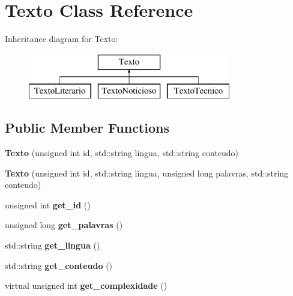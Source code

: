 \hypertarget{class_texto}{\section{Texto Class Reference}
\label{class_texto}
}
Inheritance diagram for Texto\-:\begin{figure}[H]
\begin{center}
\leavevmode
\includegraphics[height=2.000000cm]{class_texto}
\end{center}
\end{figure}
\subsection*{Public Member Functions}
\begin{DoxyCompactItemize}
\item 
\hypertarget{class_texto_a7034548c1e8e2007b0825ef3a01b1b88}{{\bfseries Texto} (unsigned int id, std\-::string lingua, std\-::string conteudo)}\label{class_texto_a7034548c1e8e2007b0825ef3a01b1b88}

\item 
\hypertarget{class_texto_a3ccc9eb8eb980eda5e5f6583cbb60425}{{\bfseries Texto} (unsigned int id, std\-::string lingua, unsigned long palavras, std\-::string conteudo)}\label{class_texto_a3ccc9eb8eb980eda5e5f6583cbb60425}

\item 
\hypertarget{class_texto_a4e1b7a020c3b1cffe4518937cdd6f565}{unsigned int {\bfseries get\-\_\-id} ()}\label{class_texto_a4e1b7a020c3b1cffe4518937cdd6f565}

\item 
\hypertarget{class_texto_a249af46529ab15e98103f1ebe9c3cabb}{unsigned long {\bfseries get\-\_\-palavras} ()}\label{class_texto_a249af46529ab15e98103f1ebe9c3cabb}

\item 
\hypertarget{class_texto_adfaca963b37bef9a739def84e2c810b6}{std\-::string {\bfseries get\-\_\-lingua} ()}\label{class_texto_adfaca963b37bef9a739def84e2c810b6}

\item 
\hypertarget{class_texto_a01a9590011195b1a258e2d3bd247ceb0}{std\-::string {\bfseries get\-\_\-conteudo} ()}\label{class_texto_a01a9590011195b1a258e2d3bd247ceb0}

\item 
\hypertarget{class_texto_aebb31cd3a54949bf24016e65a4b86336}{virtual unsigned int {\bfseries get\-\_\-complexidade} ()}\label{class_texto_aebb31cd3a54949bf24016e65a4b86336}

\end{DoxyCompactItemize}
